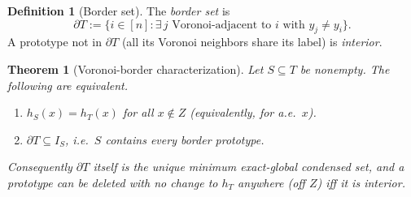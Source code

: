 \documentclass{amsart}
\newtheorem{theorem}{Theorem}
\theoremstyle{definition}
\newtheorem{definition}{Definition}
\begin{document}
\begin{definition}[Border set]\label{def:border}
The \emph{border set} is
\[
\partial T:=\{i\in[n]:\exists\,j\text{ Voronoi-adjacent to }i\text{ with }y_j\ne y_i\}.
\]
A prototype not in $\partial T$ (all its Voronoi neighbors share its label) is
\emph{interior}.
\end{definition}

\begin{theorem}[Voronoi-border characterization]\label{thm:border}
Let $S\subseteq T$ be nonempty. The following are equivalent.
\begin{enumerate}
\item[(a)] $h_S(x)=h_T(x)$ for all $x\notin Z$ (equivalently, for a.e.\ $x$).
\item[(b)] $\partial T\subseteq I_S$, i.e.\ $S$ contains every border prototype.
\end{enumerate}
Consequently $\partial T$ itself is the unique \emph{minimum} exact-global
condensed set, and a prototype can be deleted with no change to $h_T$ anywhere
(off $Z$) iff it is interior.
\end{theorem}
\end{document}
